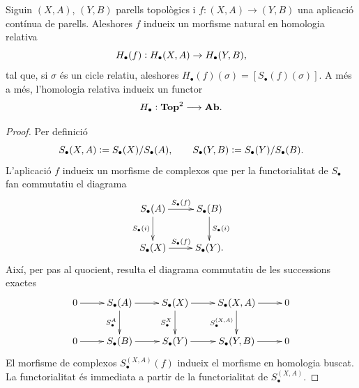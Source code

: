 \documentclass[../main.tex]{subfiles}
\begin{document}
\begin{prop}
Siguin $(X,A)$, $(Y,B)$ parells topològics i $f:(X,A)\rightarrow (Y,B)$ una aplicació contínua de parells. Aleshores $f$ indueix un morfisme natural en homologia relativa
\begin{equation}
    \notag
    H_\bullet(f):H_\bullet(X,A)\rightarrow H_\bullet(Y,B),
\end{equation}
tal que, si $\sigma$ és un cicle relatiu, aleshores $H_\bullet(f)(\sigma) = [S_\bullet(f)(\sigma)]$. A més a més, l'homologia relativa indueix un functor
\begin{equation}
    \notag
    H_\bullet:\mathbf{Top}^2\longrightarrow \mathbf{Ab}.
\end{equation}  
\end{prop}
\begin{proof}
Per definició
\begin{equation}
    \notag
    S_\bullet(X,A):=S_\bullet(X)/S_\bullet(A),\qquad S_\bullet(Y,B):=S_\bullet(Y)/S_\bullet(B).
\end{equation}
L'aplicació $f$ indueix un morfisme de complexos que per la functorialitat de $S_\bullet$ fan commutatiu el diagrama
\begin{equation}
    \notag
    \xymatrix{
    S_\bullet(A)\ar[r]^{S_\bullet(f)}\ar[d]_{S_\bullet(i)} & S_\bullet(B)\ar[d]^{S_\bullet(i)}\\
    S_\bullet(X)\ar[r]^{S_\bullet(f)} & S_\bullet(Y).
    }
\end{equation}
Així, per pas al quocient, resulta el diagrama commutatiu de les successions exactes
\begin{equation}
    \notag
    \xymatrix{
    0\ar[r]&S_\bullet(A)\ar[r]\ar[d]_{S_\bullet^{A}} & S_\bullet(X)\ar[r]\ar[d]_{S_\bullet^X}& S_\bullet(X,A)\ar[r]\ar[d]_{S_\bullet^{(X,A)}} & 0\\
    0\ar[r] & S_\bullet(B)\ar[r] & S_\bullet(Y)\ar[r] & S_\bullet(Y,B)\ar[r] & 0
    }
\end{equation}
El morfisme de complexos $S_\bullet^{(X,A)}(f)$ indueix el morfisme en homologia buscat. La functorialitat és immediata a partir de la functorialitat de $S_\bullet^{(X,A)}$.
\end{proof}
\end{document}

